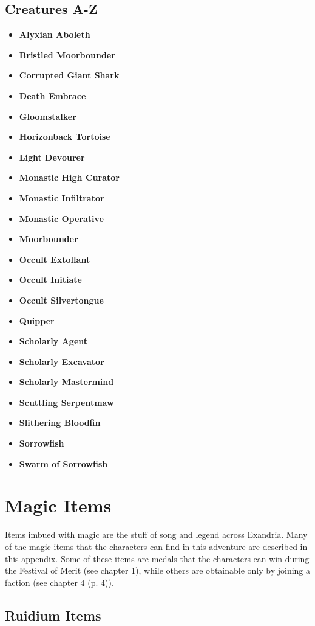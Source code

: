 \documentclass[a4paper, 11pt, bg=full, twocolumn, nooutline]{dndbook}
\begin{document}
\section{Creatures A-Z}

\begin{itemize}
\item \textbf{Alyxian Aboleth}
\item \textbf{Bristled Moorbounder}
\item \textbf{Corrupted Giant Shark}
\item \textbf{Death Embrace}
\item \textbf{Gloomstalker}
\item \textbf{Horizonback Tortoise}
\item \textbf{Light Devourer}
\item \textbf{Monastic High Curator}
\item \textbf{Monastic Infiltrator}
\item \textbf{Monastic Operative}
\item \textbf{Moorbounder}
\item \textbf{Occult Extollant}
\item \textbf{Occult Initiate}
\item \textbf{Occult Silvertongue}
\item \textbf{Quipper}
\item \textbf{Scholarly Agent}
\item \textbf{Scholarly Excavator}
\item \textbf{Scholarly Mastermind}
\item \textbf{Scuttling Serpentmaw}
\item \textbf{Slithering Bloodfin}
\item \textbf{Sorrowfish}
\item \textbf{Swarm of Sorrowfish}
\end{itemize}

\chapter{Magic Items}\label{ch:magic-items-10-10}

Items imbued with magic are the stuff of song and legend across Exandria. Many of the magic items that the characters can find in this adventure are described in this appendix. Some of these items are medals that the characters can win during the Festival of Merit (see chapter 1), while others are obtainable only by joining a faction (see chapter 4 (p. 4)).
\section{Ruidium Items}
\end{document}
